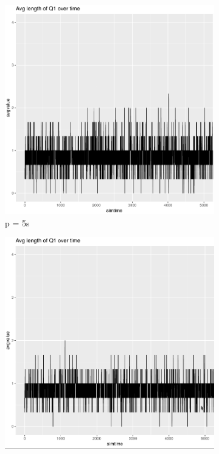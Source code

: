 \documentclass[a4paper,11pt]{article}
\begin{document}
\begin{figure}[h!]
    \begin{subfigure}[t]{.5\textwidth}
      \centering
      \includegraphics[width=.9\linewidth]{images/chart-q1avglength-5.png}
      \caption{p = 5s}
      \label{fig:sfig1}
    \end{subfigure}%
    \begin{subfigure}[t]{.5\textwidth}
      \centering
      \includegraphics[width=.9\linewidth]{images/chart-q1avglength-75.png}

\end{subfigure}
\end{figure}
\end{document}
